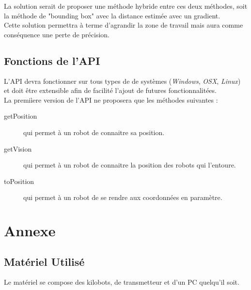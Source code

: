 \documentclass[a4paper,8pt]{report}
\begin{document}
\smallskip
La solution serait de proposer une m\'ethode hybride entre ces deux m\'ethodes, soit la m\'ethode de "bounding box" avec la distance estim\'ee avec un gradient.\\
Cette solution permettra \`a terme d'agrandir la zone de travail mais aura comme cons\'equence une perte de pr\'ecision.\\


\section*{Fonctions de l'API}\label{sec:name}

L'API devra fonctionner sur tous types de de syst\`emes (\textit{Windows}, \textit{OSX}, \textit{Linux}) et doit \^etre extensible afin de facilit\'e l'ajout de futures fonctionnalit\'ees.\\

La premi\`iere version de l'API ne proposera que les m\'ethodes suivantes :

\begin{description}
\item[getPosition] qui permet \`a un robot de connaitre sa position.
\item[getVision] qui permet \`a un robot de connaitre la position des robots qui l'entoure.
\item[toPosition] qui permet \`a un robot de se rendre aux coordonn\'ees en param\`etre.
\end{description}


\chapter{Annexe}

\section*{Mat\'eriel Utilis\'e}\label{sec:name}

Le mat\'eriel se compose des kilobots, de transmetteur et d'un PC quelqu'il soit.
\end{document}
